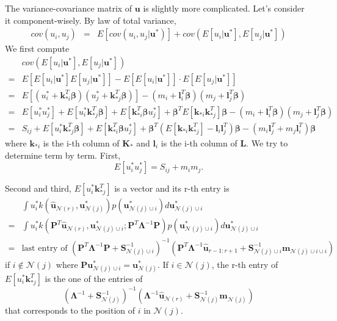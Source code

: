 \documentclass[smallextended,natbib]{svjour3}       %
\begin{document}
The variance-covariance matrix of $\mathbf{u}$ is slightly more complicated. Let's consider it component-wisely. By law of total variance, 
\begin{eqnarray*}
cov(u_{i},u_{j}) & = & E[cov(u_{i},u_{j}\vert\mathbf{u}^{*})]+cov(E[u_{i}\vert\mathbf{u}^{*}],E[u_{j}\vert\mathbf{u}^{*}])
\end{eqnarray*}
We first compute 
\begin{align*}
 & cov(E[u_{i}\vert\mathbf{u}^{*}],E[u_{j}\vert\mathbf{u}^{*}])\\
= & E[E[u_{i}\vert\mathbf{u}^{*}]E[u_{j}\vert\mathbf{u}^{*}]]-E[E[u_{i}\vert\mathbf{u}^{*}]]\cdot E[E[u_{j}\vert\mathbf{u}^{*}]]\\
= & E[(u_{i}^{*}+\mathbf{k}_{*i}^{T}\boldsymbol{\beta})(u_{j}^{*}+\mathbf{k}_{*j}^{T}\boldsymbol{\beta})]-(m_{i}+\mathbf{l}_{i}^{T}\boldsymbol{\beta})(m_{j}+\mathbf{l}_{j}^{T}\boldsymbol{\beta})\\
= & E[u_{i}^{*}u_{j}^{*}]+E[u_{i}^{*}\mathbf{k}_{*j}^{T}\boldsymbol{\beta}]+E[\mathbf{k}_{*i}^{T}\boldsymbol{\beta}u_{j}^{*}]+\boldsymbol{\beta}^{T}E[\mathbf{k}_{*i}\mathbf{k}_{*j}^{T}]\boldsymbol{\beta}-(m_{i}+\mathbf{l}_{i}^{T}\boldsymbol{\beta})(m_{j}+\mathbf{l}_{j}^{T}\boldsymbol{\beta})\\
= & S_{ij}+E[u_{i}^{*}\mathbf{k}_{*j}^{T}\boldsymbol{\beta}]+E[\mathbf{k}_{*i}^{T}\boldsymbol{\beta}u_{j}^{*}]+\boldsymbol{\beta}^{T}(E[\mathbf{k}_{*i}\mathbf{k}_{*j}^{T}]-\mathbf{l}_{i}\mathbf{l}_{j}^{T})\boldsymbol{\beta}-(m_{i}\mathbf{l}_{j}^{T}+m_{j}\mathbf{l}_{i}^{T})\boldsymbol{\beta}
\end{align*}
where $\mathbf{k}_{*i}$ is the i-th column of $\mathbf{K}_{*}$ and $\mathbf{l}_{i}$ is the i-th column of $\mathbf{L}$. We try to determine term by term. First, 
\[
E[u_{i}^{*}u_{j}^{*}]=S_{ij}+m_{i}m_{j}.
\]

Second and third, $E[u_{i}^{*}\mathbf{k}_{*j}^{T}]$ is a vector and its r-th entry is 
\begin{align*}
 & \int u_{i}^{*}k(\hat{\mathbf{u}}_{\mathcal{N}(r)},\mathbf{u}_{\mathcal{N}(j)}^{*})p(\mathbf{u}_{\mathcal{N}(j)\cup i}^{*})d\mathbf{u}_{\mathcal{N}(j)\cup i}^{*}\\
= & \int u_{i}^{*}k(\mathbf{P}^{T}\hat{\mathbf{u}}_{\mathcal{N}(r)},\mathbf{u}_{\mathcal{N}(j)\cup i}^{*};\mathbf{P}^{T}\boldsymbol{\Lambda}^{-1}\mathbf{P})p(\mathbf{u}_{\mathcal{N}(j)\cup i}^{*})d\mathbf{u}_{\mathcal{N}(j)\cup i}^{*}\\
= & \text{last entry of }(\mathbf{P}^{T}\boldsymbol{\Lambda}^{-1}\mathbf{P}+\mathbf{S}_{\mathcal{N}(j)\cup i}^{-1})^{-1}(\mathbf{P}^{T}\boldsymbol{\Lambda}^{-1}\hat{\mathbf{u}}_{r-1:r+1}+\mathbf{S}_{\mathcal{N}(j)\cup i}^{-1}\mathbf{m}_{\mathcal{N}(j)\cup i\cup i})
\end{align*}
if $i\notin\mathcal{N}(j)$ where $\mathbf{P}\mathbf{u}_{\mathcal{N}(j)\cup i}^{*}=\mathbf{u}_{\mathcal{N}(j)}^{*}$. If $i\in\mathcal{N}(j)$, the r-th entry of $E[u_{i}^{*}\mathbf{k}_{*j}^{T}]$ is the one of the entries of 
\[
(\boldsymbol{\Lambda}^{-1}+\mathbf{S}_{\mathcal{N}(j)}^{-1})^{-1}(\boldsymbol{\Lambda}^{-1}\hat{\mathbf{u}}_{\mathcal{N}(r)}+\mathbf{S}_{\mathcal{N}(j)}^{-1}\mathbf{m}_{\mathcal{N}(j)})
\]
 that corresponds to the position of $i$ in $\mathcal{N}(j)$.
\end{document}
